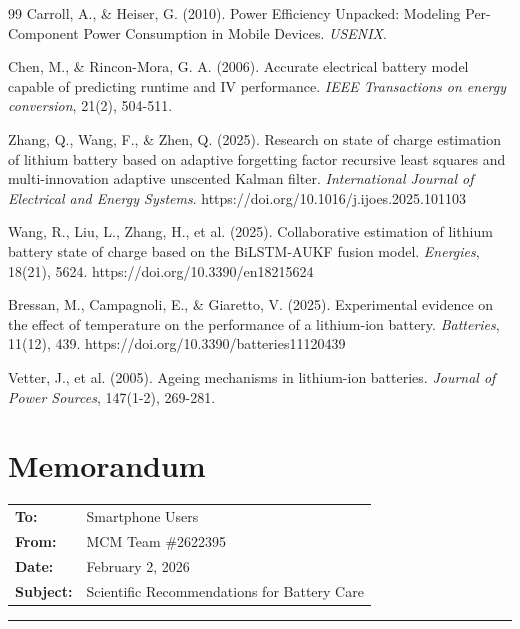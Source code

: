 \documentclass{mcmthesis}
\begin{document}
\begin{thebibliography}{99}
Carroll, A., \& Heiser, G. (2010). Power Efficiency Unpacked: Modeling Per-Component Power Consumption in Mobile Devices. \textit{USENIX}.

Chen, M., \& Rincon-Mora, G. A. (2006). Accurate electrical battery model capable of predicting runtime and IV performance. \textit{IEEE Transactions on energy conversion}, 21(2), 504-511.

Zhang, Q., Wang, F., \& Zhen, Q. (2025). Research on state of charge estimation of lithium battery based on adaptive forgetting factor recursive least squares and multi-innovation adaptive unscented Kalman filter. \textit{International Journal of Electrical and Energy Systems}. https://doi.org/10.1016/j.ijoes.2025.101103

Wang, R., Liu, L., Zhang, H., et al. (2025). Collaborative estimation of lithium battery state of charge based on the BiLSTM-AUKF fusion model. \textit{Energies}, 18(21), 5624. https://doi.org/10.3390/en18215624

Bressan, M., Campagnoli, E., \& Giaretto, V. (2025). Experimental evidence on the effect of temperature on the performance of a lithium-ion battery. \textit{Batteries}, 11(12), 439. https://doi.org/10.3390/batteries11120439

Vetter, J., et al. (2005). Ageing mechanisms in lithium-ion batteries. \textit{Journal of Power Sources}, 147(1-2), 269-281.
\end{thebibliography}

\newpage
\vspace*{-1cm} %
\section*{Memorandum}

\noindent
\begin{tabular}{ll}
\textbf{To:} & Smartphone Users \\
\textbf{From:} & MCM Team \#2622395 \\
\textbf{Date:} & February 2, 2026 \\
\textbf{Subject:} & Scientific Recommendations for Battery Care \\
\end{tabular}

\vspace{0.3cm}
\hrule
\vspace{0.4cm}
\end{document}
